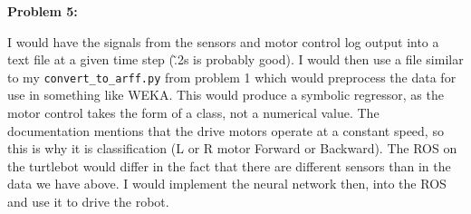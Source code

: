 \documentclass{amsart}
\theoremstyle{definition}
\begin{document}
\bigbreak
\textbf{Problem 5:}
\bigbreak


I would have the signals from the sensors and motor control log output into a text file at a given time step (\~ .2s is probably good).
I would then use a file similar to my {\tt convert\_to\_arff.py} from problem 1 which would preprocess the data for use in something like WEKA.
This would produce a symbolic regressor, as the motor control takes the form of a class, not a numerical value.
The documentation mentions that the drive motors operate at a constant speed, so this is why it is classification (L or R motor Forward or Backward).
The ROS on the turtlebot would differ in the fact that there are different sensors than in the data we have above.
I would implement the neural network then, into the ROS and use it to drive the robot.


\end{document}
